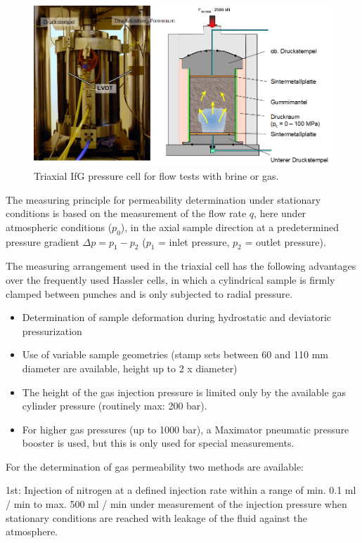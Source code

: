 \begin{figure}[!ht]
\centering
\includegraphics[width=1\textwidth]{./figures/ifg-lab-photo4.png}
\caption{Triaxial IfG pressure cell for flow tests with brine or gas.}
\label{fig:ifglabph4}
\end{figure}

The measuring principle for permeability determination under stationary conditions is based on the measurement of the 
flow rate $q$, here under atmospheric conditions ($p_0$), in the axial sample direction at a predetermined pressure gradient $\Delta p = p_1 - p_2$ ($p_1$ = inlet 
pressure, $p_2$ = outlet pressure).

The measuring arrangement used in the triaxial cell has the following advantages over the frequently used Hassler cells, in 
which a cylindrical sample is firmly clamped between punches and is only subjected to radial pressure.

\begin{itemize}
\item Determination of sample deformation during hydrostatic and deviatoric pressurization
\item Use of variable sample geometries (stamp sets between 60 and 110 mm diameter are available, height up to 2 x diameter)
\item The height of the gas injection pressure is limited only by the available gas cylinder pressure (routinely max: 200 bar).
\item For higher gas pressures (up to 1000 bar), a Maximator pneumatic pressure booster is used, but this is only used for special measurements.
\end{itemize}

For the determination of gas permeability two methods are available:

1st: Injection of nitrogen at a defined injection rate within a range of min. 0.1 ml / min to max. 500 ml / min under 
measurement of the injection pressure when stationary conditions are reached with leakage of the fluid against the atmosphere.

